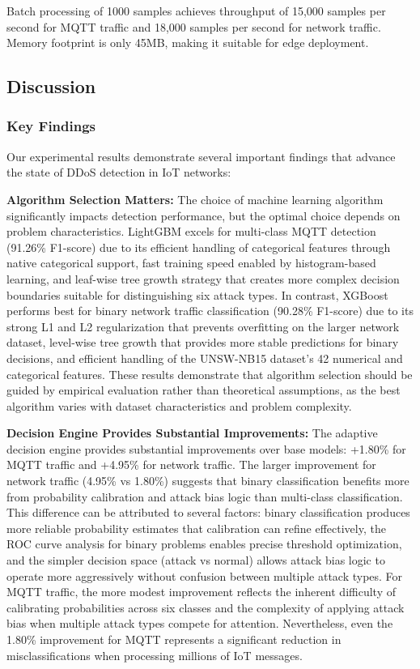 \documentclass[conference]{IEEEtran}
\begin{document}
Batch processing of 1000 samples achieves throughput of 15,000 samples per second for MQTT traffic and 18,000 samples per second for network traffic. Memory footprint is only 45MB, making it suitable for edge deployment.

\subsection{Discussion}

\subsubsection{Key Findings}

Our experimental results demonstrate several important findings that advance the state of DDoS detection in IoT networks:

\textbf{Algorithm Selection Matters:} The choice of machine learning algorithm significantly impacts detection performance, but the optimal choice depends on problem characteristics. LightGBM excels for multi-class MQTT detection (91.26\% F1-score) due to its efficient handling of categorical features through native categorical support, fast training speed enabled by histogram-based learning, and leaf-wise tree growth strategy that creates more complex decision boundaries suitable for distinguishing six attack types. In contrast, XGBoost performs best for binary network traffic classification (90.28\% F1-score) due to its strong L1 and L2 regularization that prevents overfitting on the larger network dataset, level-wise tree growth that provides more stable predictions for binary decisions, and efficient handling of the UNSW-NB15 dataset's 42 numerical and categorical features. These results demonstrate that algorithm selection should be guided by empirical evaluation rather than theoretical assumptions, as the best algorithm varies with dataset characteristics and problem complexity.

\textbf{Decision Engine Provides Substantial Improvements:} The adaptive decision engine provides substantial improvements over base models: +1.80\% for MQTT traffic and +4.95\% for network traffic. The larger improvement for network traffic (4.95\% vs 1.80\%) suggests that binary classification benefits more from probability calibration and attack bias logic than multi-class classification. This difference can be attributed to several factors: binary classification produces more reliable probability estimates that calibration can refine effectively, the ROC curve analysis for binary problems enables precise threshold optimization, and the simpler decision space (attack vs normal) allows attack bias logic to operate more aggressively without confusion between multiple attack types. For MQTT traffic, the more modest improvement reflects the inherent difficulty of calibrating probabilities across six classes and the complexity of applying attack bias when multiple attack types compete for attention. Nevertheless, even the 1.80\% improvement for MQTT represents a significant reduction in misclassifications when processing millions of IoT messages.
\end{document}
